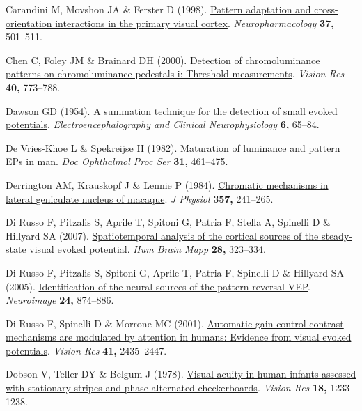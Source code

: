 \documentclass[
  letterpaper,
  DIV=11,
  numbers=noendperiod]{scrartcl}
\newlength{\cslhangindent}
\newenvironment{CSLReferences}[2] %
 {\begin{list}{}{%
  \setlength{\itemindent}{0pt}
  \setlength{\leftmargin}{0pt}
  \setlength{\parsep}{0pt}
  \ifodd #1
   \setlength{\leftmargin}{\cslhangindent}
   \setlength{\itemindent}{-1\cslhangindent}
  \fi
  \setlength{\itemsep}{#2\baselineskip}}}
 {\end{list}}
\begin{document}
\begin{CSLReferences}{1}{1}
Carandini M, Movshon JA \& Ferster D (1998).
\href{https://doi.org/10.1016/s0028-3908(98)00069-0}{Pattern adaptation
and cross-orientation interactions in the primary visual cortex}.
\emph{Neuropharmacology} \textbf{37,} 501--511.

Chen C, Foley JM \& Brainard DH (2000).
\href{https://doi.org/10.1016/s0042-6989(99)00227-8}{Detection of
chromoluminance patterns on chromoluminance pedestals i: Threshold
measurements}. \emph{Vision Res} \textbf{40,} 773--788.

Dawson GD (1954). \href{https://doi.org/10.1016/0013-4694(54)90007-3}{A
summation technique for the detection of small evoked potentials}.
\emph{Electroencephalography and Clinical Neurophysiology} \textbf{6,}
65--84.

De Vries-Khoe L \& Spekreijse H (1982). Maturation of luminance and
pattern EPs in man. \emph{Doc Ophthalmol Proc Ser} \textbf{31,}
461--475.

Derrington AM, Krauskopf J \& Lennie P (1984).
\href{https://doi.org/10.1113/jphysiol.1984.sp015499}{Chromatic
mechanisms in lateral geniculate nucleus of macaque}. \emph{J Physiol}
\textbf{357,} 241--265.

Di Russo F, Pitzalis S, Aprile T, Spitoni G, Patria F, Stella A,
Spinelli D \& Hillyard SA (2007).
\href{https://doi.org/10.1002/hbm.20276}{Spatiotemporal analysis of the
cortical sources of the steady-state visual evoked potential}. \emph{Hum
Brain Mapp} \textbf{28,} 323--334.

Di Russo F, Pitzalis S, Spitoni G, Aprile T, Patria F, Spinelli D \&
Hillyard SA (2005).
\href{https://doi.org/10.1016/j.neuroimage.2004.09.029}{Identification
of the neural sources of the pattern-reversal VEP}. \emph{Neuroimage}
\textbf{24,} 874--886.

Di Russo F, Spinelli D \& Morrone MC (2001).
\href{https://doi.org/10.1016/s0042-6989(01)00134-1}{Automatic gain
control contrast mechanisms are modulated by attention in humans:
Evidence from visual evoked potentials}. \emph{Vision Res} \textbf{41,}
2435--2447.

Dobson V, Teller DY \& Belgum J (1978).
\href{https://doi.org/10.1016/0042-6989(78)90109-8}{Visual acuity in
human infants assessed with stationary stripes and phase-alternated
checkerboards}. \emph{Vision Res} \textbf{18,} 1233--1238.


\end{CSLReferences}
\end{document}
